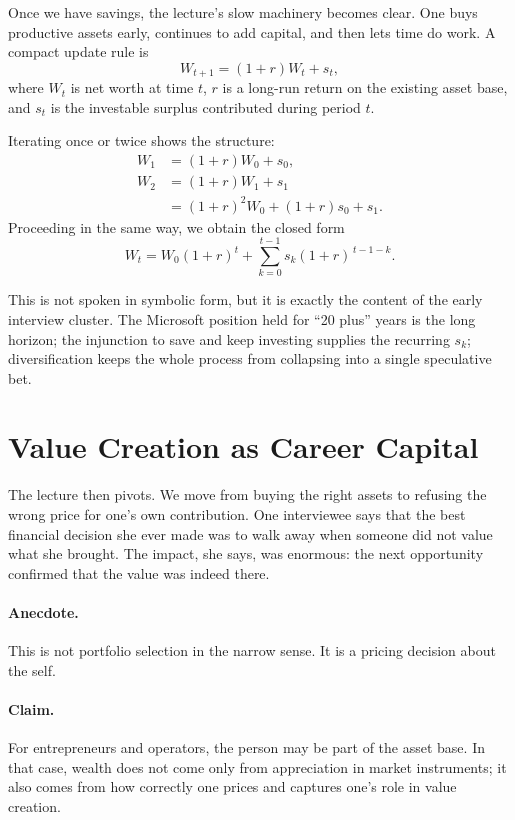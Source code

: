 Once we have savings, the lecture's slow machinery becomes clear. One buys productive assets early, continues to add capital, and then lets time do work. A compact update rule is
\begin{equation}
W_{t+1}=(1+r)W_t+s_t,
\end{equation}
where $W_t$ is net worth at time $t$, $r$ is a long-run return on the existing asset base, and $s_t$ is the investable surplus contributed during period $t$.

Iterating once or twice shows the structure:
\begin{align}
W_1 &= (1+r)W_0+s_0,\\
W_2 &= (1+r)W_1+s_1 \\
    &= (1+r)^2 W_0 + (1+r)s_0 + s_1.
\end{align}
Proceeding in the same way, we obtain the closed form
\begin{equation}
W_t = W_0(1+r)^t + \sum_{k=0}^{t-1} s_k(1+r)^{\,t-1-k}.
\end{equation}

This is not spoken in symbolic form, but it is exactly the content of the early interview cluster. The Microsoft position held for ``20 plus'' years is the long horizon; the injunction to save and keep investing supplies the recurring $s_k$; diversification keeps the whole process from collapsing into a single speculative bet.

\section{Value Creation as Career Capital}

The lecture then pivots. We move from buying the right assets to refusing the wrong price for one's own contribution. One interviewee says that the best financial decision she ever made was to walk away when someone did not value what she brought. The impact, she says, was enormous: the next opportunity confirmed that the value was indeed there.

\paragraph{Anecdote.}
This is not portfolio selection in the narrow sense. It is a pricing decision about the self.

\paragraph{Claim.}
For entrepreneurs and operators, the person may be part of the asset base. In that case, wealth does not come only from appreciation in market instruments; it also comes from how correctly one prices and captures one's role in value creation.

